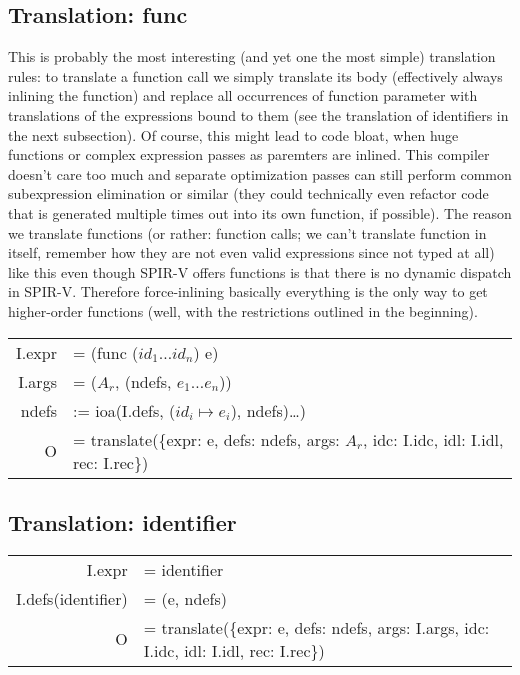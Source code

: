 \documentclass[letterpaper,12pt]{article}
\begin{document}
\subsection{Translation: func}

This is probably the most interesting (and yet one the most simple) translation
rules: to translate a function call we simply translate its body
(effectively always inlining the function) and replace all occurrences of 
function parameter with translations of the expressions bound to them (see
the translation of identifiers in the next subsection). Of course, this
might lead to code bloat, when huge functions or complex expression passes
as paremters are inlined. This compiler doesn't care too much and
separate optimization passes can still perform common subexpression
elimination or similar (they could technically even refactor code that
is generated multiple times out into its own function, if possible).
The reason we translate functions (or rather: function calls; we can't translate
function in itself, remember how they are not even valid expressions since
not typed at all) like this even though SPIR-V offers functions is that
there is no dynamic dispatch in SPIR-V. Therefore force-inlining basically
everything is the only way to get higher-order functions (well, with
the restrictions outlined in the beginning).

\medskip
\begin{tabularx}{\linewidth}{rl}
	I.expr &= (func ($id_1 \dots id_n$) e) \\
	I.args &= ($A_r$, (ndefs, $e_1 \dots e_n$)) \\
	ndefs &:= ioa(I.defs, ($id_i \mapsto e_i$), ndefs)\dots) \\
	O &= translate(\{expr: e, defs: ndefs, args: $A_r$, idc: I.idc, idl: I.idl, rec: I.rec\}) \\
\end{tabularx}

\subsection{Translation: identifier}

\begin{tabularx}{\linewidth}{rl}
	I.expr &= identifier \\
	I.defs(identifier) &= (e, ndefs) \\
	O &= translate(\{expr: e, defs: ndefs, args: I.args, idc: I.idc, idl: I.idl, rec: I.rec\}) \\
\end{tabularx}
\end{document}
